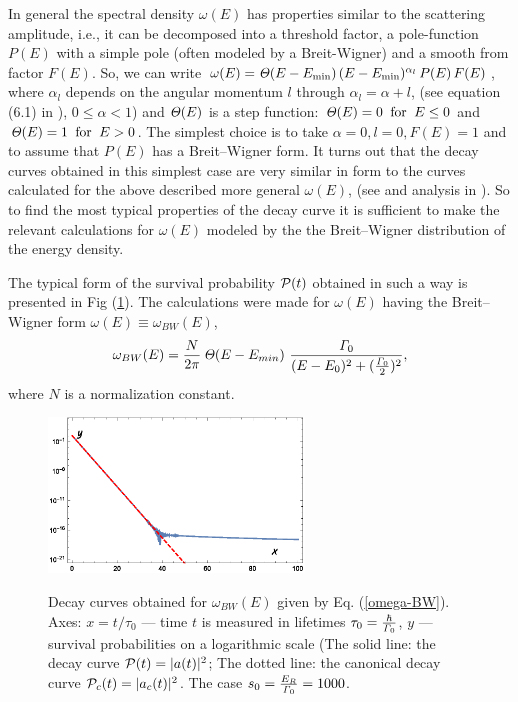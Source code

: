 \documentclass[12pt]{article}
\begin{document}
In general the spectral density $\omega(E)$ has properties similar to the scattering amplitude, i.e., it can be
decomposed into a threshold factor, a pole-function $P(E)$ with a simple pole (often modeled by a Breit-Wigner)
and a smooth from factor $F(E)$.
So, we can write $\omega(E)= {\it\Theta}(E-E_{\rm min})\,(E-E_{\rm min})^{\alpha_{l}}\,P(E)\,F(E) $,
where
$\alpha_{l}$ depends on the angular momentum $l$ through $\alpha_{l} = \alpha + l$, \cite{fonda}
(see equation (6.1) in \cite{fonda}),  $0 \leq \alpha <1$)
 and ${\it\Theta}(E)$ is a step function: ${\it\Theta}(E) = 0\;\;{\rm  for}\;\; E \leq 0$
and ${\it\Theta}(E) = 1\;\;{\rm for}\;\;E>0  $. The simplest choice is to take $\alpha = 0, l=0, F(E) = 1$ and
to assume that $P(E)$ has a Breit--Wigner form.
It turns out that the decay curves obtained in this simplest case are very similar in form to the curves calculated for
the above described
more general $\omega (E)$,
(see \cite{nowakowski} and analysis in \cite{fonda}).
So to find the most typical properties of the decay curve it is sufficient to make the relevant calculations for  $\omega (E)$ modeled by the the Breit--Wigner
distribution of the energy density.

The typical  form of the survival probability ${\cal P}(t)$ obtained in such a way is presented in Fig (\ref{f1}).
The calculations were made for $\omega (E)$ having the Breit--Wigner form
$\omega (E) \equiv \omega_{BW} (E)$,
\begin{equation}
\omega_{BW}(E) =  \frac{N}{2\pi}\,  {\it\Theta} (E - E_{min}) \
\frac{{\it\Gamma}_{0}}{(E-E_{0})^{2} +
(\frac{{\it\Gamma}_{0}}{2})^{2}}, \label{omega-BW}
\end{equation}
where $N$ is a normalization constant.
\begin{figure}[t]
\begin{center}
\includegraphics[width=68mm]{f1a.eps}\\
\caption{Decay curves obtained for $\omega_{BW}(E)$ given by Eq. (\ref{omega-BW}).
Axes: $x =t / \tau_{0} $ --- time $t$ is measured in lifetimes
$\tau_{0}= \frac{\hbar}{{\it\Gamma}_{0}}$,    $y$ --- survival probabilities on a logarithmic scale (The solid line:  the decay curve ${\cal P}(t) = |a(t)|^{2}$; The dotted line:  the canonical decay curve
${\cal P}_{c}(t) = |a_{c}(t)|^{2}$. The case $s_{0} = \frac{E_{R}}{{\it\Gamma}_{0}} = 1000$.}
  \label{f1}
\end{center}
\end{figure}
\end{document}
